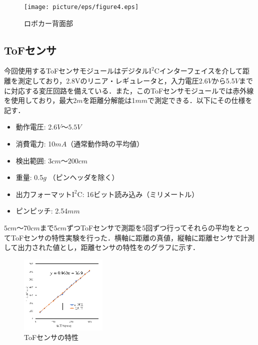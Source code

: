 \begin{figure}[htb]
 \centering
  \texttt{[image: picture/eps/figure4.eps]}
  \caption{ロボカー背面部}
  \label{fig::figure4}
\end{figure}

\newpage
\subsection{ToFセンサ}
今回使用するToFセンサモジュールはデジタル$\mathrm{I^{2}C}$インターフェイスを介して距離を測定しており，2.8$\mathrm{V}$のリニア・レギュレータと，入力電圧2.6$\unit{V}$から5.5$\unit{V}$までに対応する変圧回路を備えている．また，このToFセンサモジュールでは赤外線を使用しており，最大2$\unit{m}$を距離分解能は1$\unit{mm}$で測定できる．以下にその仕様を記す\cite{tof_sensor1}．
\begin{itemize}
 \item 動作電圧: 2.6$\unit{V}〜5.5\unit{V}$
 \item 消費電力: 10$\unit{mA}$（通常動作時の平均値）
 \item 検出範囲: 3$\unit{cm}〜200\unit{cm}$
 \item 重量: 0.5$\unit{g}$ （ピンヘッダを除く）
 \item 出力フォーマット$\mathrm{I^{2}C}$: 16ビット読み込み（ミリメートル）
 \item ピンピッチ: 2.54$\unit{mm}$ 
\end{itemize}

$5\unit{cm}〜70\unit{cm}$まで$5\unit{cm}$ずつToFセンサで測距を5回ずつ行ってそれらの平均をとってToFセンサの特性実験を行った．横軸に距離の真値，縦軸に距離センサで計測して出力された値とし，距離センサの特性をのグラフに示す．

\begin{figure}[htb]
  \centering
  \includegraphics[width=0.5\hsize]{picture/eps/osada_graph.eps}
  \caption{ToFセンサの特性}
  \label{fig::tof_graph}
 \end{figure}

